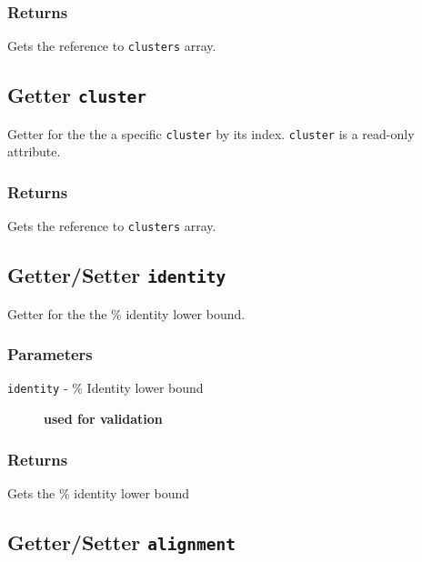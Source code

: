 \subsubsection*{Returns\label{Returns}}


Gets the reference to \texttt{clusters} array.

\subsection*{Getter \texttt{cluster}\label{Getter_cluster}}


Getter for the the a specific \texttt{cluster} by its index. \texttt{cluster} is a read-only attribute.

\subsubsection*{Returns\label{Returns}}


Gets the reference to \texttt{clusters} array.

\subsection*{Getter/Setter \texttt{identity}\label{Getter_Setter_identity}}


Getter for the the \% identity lower bound.

\subsubsection*{Parameters\label{Parameters}}
\begin{description}

\item[{\texttt{identity} - \% Identity lower bound}] \textbf{used for validation}\end{description}
\subsubsection*{Returns\label{Returns}}


Gets the \% identity lower bound

\subsection*{Getter/Setter \texttt{alignment}\label{Getter_Setter_alignment}}


